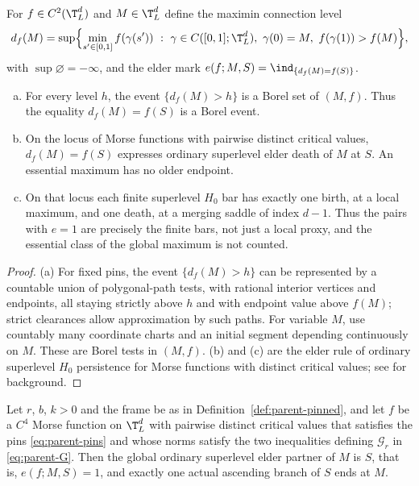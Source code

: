 \begin{lemma}\label{lem:parent-mark}
For $f\in C^2(\T^d_L)$ and $M\in\T^d_L$ define the maximin connection level
\begin{equation}\label{eq:parent-df}
d_f(M)=\sup\Bigl\{\min_{s'\in[0,1]}f(\gamma(s'))\ :\ \gamma\in C([0,1];\T^d_L),\ \gamma(0)=M,\ f(\gamma(1))>f(M)\Bigr\},
\end{equation}
with $\sup\varnothing=-\infty$, and the elder mark $e(f;M,S)=\ind_{\{d_f(M)=f(S)\}}$.
\begin{enumerate}[(a),leftmargin=2em]
\item For every level $h$, the event $\{d_f(M)>h\}$ is a Borel set of $(M,f)$. Thus the equality $d_f(M)=f(S)$ is a Borel event.
\item On the locus of Morse functions with pairwise distinct critical values, $d_f(M)=f(S)$ expresses ordinary superlevel elder death of $M$ at $S$. An essential maximum has no older endpoint.
\item On that locus each finite superlevel $H_0$ bar has exactly one birth, at a local maximum, and one death, at a merging saddle of index $d-1$. Thus the pairs with $e=1$ are precisely the finite bars, not just a local proxy, and the essential class of the global maximum is not counted.
\end{enumerate}
\end{lemma}

\begin{proof}
(a) For fixed pins, the event $\{d_f(M)>h\}$ can be represented by a countable union of polygonal-path tests, with rational interior vertices and endpoints, all staying strictly above $h$ and with endpoint value above $f(M)$; strict clearances allow approximation by such paths. For variable $M$, use countably many coordinate charts and an initial segment depending continuously on $M$. These are Borel tests in $(M,f)$. (b) and (c) are the elder rule of ordinary superlevel $H_0$ persistence for Morse functions with distinct critical values; see \cite[\S3]{Curry} for background.
\end{proof}

\begin{lemma}\label{lem:parent-capimpl}
Let $r$, $b$, $k>0$ and the frame be as in Definition~\ref{def:parent-pinned}, and let $f$ be a $C^4$ Morse function on $\T^d_L$ with pairwise distinct critical values that satisfies the pins \eqref{eq:parent-pins} and whose norms satisfy the two inequalities defining $\mathcal G_r$ in \eqref{eq:parent-G}. Then the global ordinary superlevel elder partner of $M$ is $S$, that is, $e(f;M,S)=1$, and exactly one actual ascending branch of $S$ ends at $M$.
\end{lemma}

